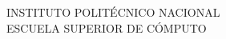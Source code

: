 
\begin{minipage}[b]{.1\textwidth}
\end{minipage}
\begin{minipage}{.8\textwidth}

  \begin{center}

        \large{INSTITUTO} \large{POLITÉCNICO} \large{NACIONAL}\\
        \large{ESCUELA} \large{SUPERIOR} \large{DE} \large{CÓMPUTO}\\

  \end{center}





\end{minipage}
\begin{minipage}[b]{.1\textwidth}
\end{minipage}

